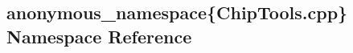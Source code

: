 \hypertarget{namespaceanonymous__namespace_02ChipTools_8cpp_03}{}\subsection{anonymous\+\_\+namespace\{Chip\+Tools.\+cpp\} Namespace Reference}
\label{namespaceanonymous__namespace_02ChipTools_8cpp_03}
